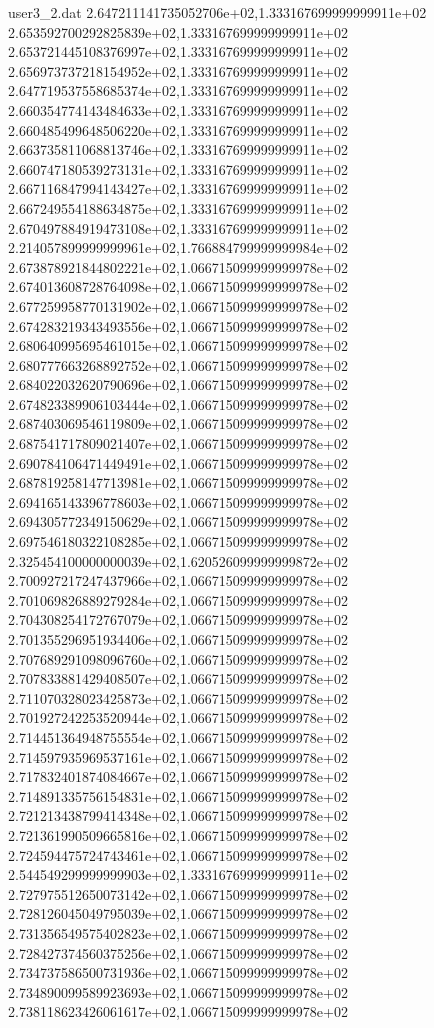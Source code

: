 \begin{filecontents}{user3_2.dat}
2.647211141735052706e+02,1.333167699999999911e+02
2.653592700292825839e+02,1.333167699999999911e+02
2.653721445108376997e+02,1.333167699999999911e+02
2.656973737218154952e+02,1.333167699999999911e+02
2.647719537558685374e+02,1.333167699999999911e+02
2.660354774143484633e+02,1.333167699999999911e+02
2.660485499648506220e+02,1.333167699999999911e+02
2.663735811068813746e+02,1.333167699999999911e+02
2.660747180539273131e+02,1.333167699999999911e+02
2.667116847994143427e+02,1.333167699999999911e+02
2.667249554188634875e+02,1.333167699999999911e+02
2.670497884919473108e+02,1.333167699999999911e+02
2.214057899999999961e+02,1.766884799999999984e+02
2.673878921844802221e+02,1.066715099999999978e+02
2.674013608728764098e+02,1.066715099999999978e+02
2.677259958770131902e+02,1.066715099999999978e+02
2.674283219343493556e+02,1.066715099999999978e+02
2.680640995695461015e+02,1.066715099999999978e+02
2.680777663268892752e+02,1.066715099999999978e+02
2.684022032620790696e+02,1.066715099999999978e+02
2.674823389906103444e+02,1.066715099999999978e+02
2.687403069546119809e+02,1.066715099999999978e+02
2.687541717809021407e+02,1.066715099999999978e+02
2.690784106471449491e+02,1.066715099999999978e+02
2.687819258147713981e+02,1.066715099999999978e+02
2.694165143396778603e+02,1.066715099999999978e+02
2.694305772349150629e+02,1.066715099999999978e+02
2.697546180322108285e+02,1.066715099999999978e+02
2.325454100000000039e+02,1.620526099999999872e+02
2.700927217247437966e+02,1.066715099999999978e+02
2.701069826889279284e+02,1.066715099999999978e+02
2.704308254172767079e+02,1.066715099999999978e+02
2.701355296951934406e+02,1.066715099999999978e+02
2.707689291098096760e+02,1.066715099999999978e+02
2.707833881429408507e+02,1.066715099999999978e+02
2.711070328023425873e+02,1.066715099999999978e+02
2.701927242253520944e+02,1.066715099999999978e+02
2.714451364948755554e+02,1.066715099999999978e+02
2.714597935969537161e+02,1.066715099999999978e+02
2.717832401874084667e+02,1.066715099999999978e+02
2.714891335756154831e+02,1.066715099999999978e+02
2.721213438799414348e+02,1.066715099999999978e+02
2.721361990509665816e+02,1.066715099999999978e+02
2.724594475724743461e+02,1.066715099999999978e+02
2.544549299999999903e+02,1.333167699999999911e+02
2.727975512650073142e+02,1.066715099999999978e+02
2.728126045049795039e+02,1.066715099999999978e+02
2.731356549575402823e+02,1.066715099999999978e+02
2.728427374560375256e+02,1.066715099999999978e+02
2.734737586500731936e+02,1.066715099999999978e+02
2.734890099589923693e+02,1.066715099999999978e+02
2.738118623426061617e+02,1.066715099999999978e+02

\end{filecontents}
